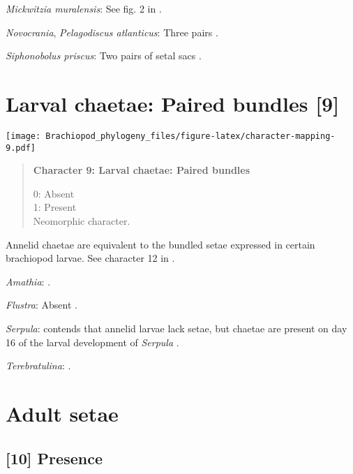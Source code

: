 \documentclass[openany]{book}
\theoremstyle{definition}
\theoremstyle{definition}
\theoremstyle{definition}
\theoremstyle{remark}
\begin{document}
\hypertarget{Mickwitzia_muralensis-coding-8}{}
\emph{Mickwitzia muralensis}: See fig. 2 in
\citet{Balthasar2009Thebrachiopod}.

\hypertarget{Novocrania-coding-8}{}
\emph{Novocrania}, \emph{Pelagodiscus atlanticus}: Three pairs
\citep{Carlson1995Phylogeneticrelationships}.

\hypertarget{Siphonobolus_priscus-coding-8}{}
\emph{Siphonobolus priscus}: Two pairs of setal sacs
\citep{Popov2009Earlyontogeny}.

\section{Larval chaetae: Paired bundles
{[}9{]}}\label{larval-chaetae-paired-bundles-9}

\texttt{[image: Brachiopod\_phylogeny\_files/figure-latex/character-mapping-9.pdf]}

\begin{quote}
\textbf{Character 9: Larval chaetae: Paired bundles}

0: Absent\\
1: Present\\
Neomorphic character.
\end{quote}

Annelid chaetae are equivalent to the bundled setae expressed in certain
brachiopod larvae. See character 12 in \citet{Vinther2008}.

\hypertarget{Amathia-coding-9}{}
\emph{Amathia}: \citep{Reed1982}.

\hypertarget{Flustra-coding-9}{}
\emph{Flustra}: Absent \citep{Zimmer2013}.

\hypertarget{Serpula-coding-9}{}
\emph{Serpula}: \citet{Luter2000} contends that annelid larvae lack
setae, but chaetae are present on day 16 of the larval development of
\emph{Serpula} \citep{Keay2007}.

\hypertarget{Terebratulina-coding-9}{}
\emph{Terebratulina}: \citet{Williams1997Introduction}.

\section{Adult setae}\label{adult-setae}

\subsection*{{[}10{]} Presence}\label{presence}
\end{document}
